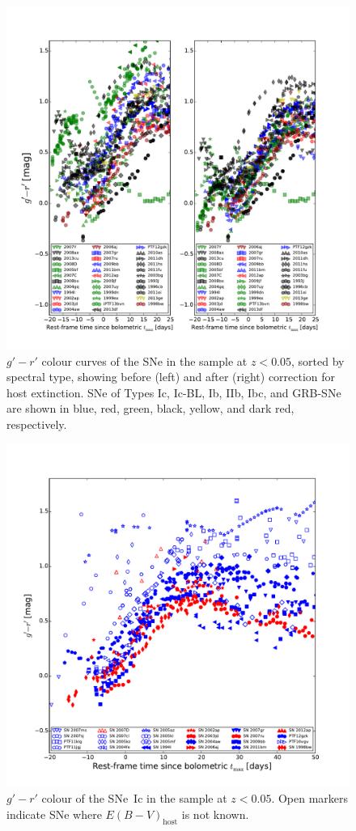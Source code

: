 \documentclass[a4paper,fleqn,usenatbib]{mnras}
\begin{document}
\begin{figure}
\centering
\includegraphics[scale=0.7]{cc_by_type.pdf}
\caption{$g'-r'$ colour curves of the SNe in the sample at $z<0.05$, sorted by spectral type, showing before (left) and after (right) correction for host extinction. SNe of Types Ic, Ic-BL, Ib, IIb, Ibc, and GRB-SNe are shown in blue, red, green, black, yellow, and dark red, respectively.}
\label{fig:cc}
\end{figure}

\begin{figure}
\centering
\includegraphics[scale=0.7]{g-r_curves_Type_c.pdf}
\caption{$g'-r'$ colour of the SNe~Ic in the sample at $z<0.05$. Open markers indicate SNe where $E(B-V)_{\mathrm{host}}$ is not known.}
\label{fig:colourc}
\end{figure}
\end{document}
